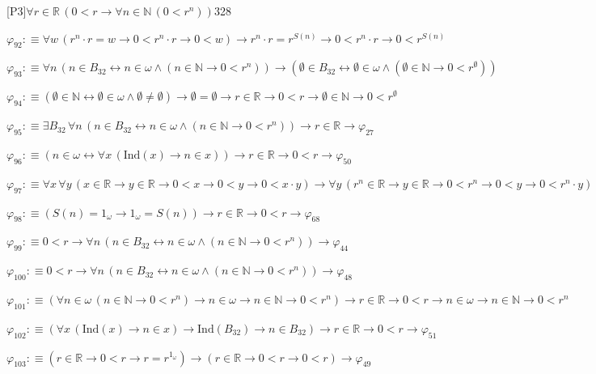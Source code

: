 \begin{fullproof}{[P3]}{$\forall r \in \mathbb{R}\,(0 < r \to \forall n \in \mathbb{N}\,(0 < {{r}^{n}}))$}{328}
\begin{abbrevlist}
\item $\varphi_{92} :\equiv \forall w\,({{r}^{n}} \cdot r = w \to 0 < {{r}^{n}} \cdot r \to 0 < w) \to {{r}^{n}} \cdot r = {{r}^{S(n)}} \to 0 < {{r}^{n}} \cdot r \to 0 < {{r}^{S(n)}}$
\item $\varphi_{93} :\equiv \forall n\,(n \in B_{32} \leftrightarrow n \in \omega \land (n \in \mathbb{N} \to 0 < {{r}^{n}})) \to (\emptyset \in B_{32} \leftrightarrow \emptyset \in \omega \land (\emptyset \in \mathbb{N} \to 0 < {{r}^{\emptyset}}))$
\item $\varphi_{94} :\equiv (\emptyset \in \mathbb{N} \leftrightarrow \emptyset \in \omega \land \emptyset \neq \emptyset) \to \emptyset = \emptyset \to r \in \mathbb{R} \to 0 < r \to \emptyset \in \mathbb{N} \to 0 < {{r}^{\emptyset}}$
\item $\varphi_{95} :\equiv \exists B_{32}\,\forall n\,(n \in B_{32} \leftrightarrow n \in \omega \land (n \in \mathbb{N} \to 0 < {{r}^{n}})) \to r \in \mathbb{R} \to \varphi_{27}$
\item $\varphi_{96} :\equiv (n \in \omega \leftrightarrow \forall x\,(\mathrm{Ind}(x) \to n \in x)) \to r \in \mathbb{R} \to 0 < r \to \varphi_{50}$
\item $\varphi_{97} :\equiv \forall x\,\forall y\,(x \in \mathbb{R} \to y \in \mathbb{R} \to 0 < x \to 0 < y \to 0 < x \cdot y) \to \forall y\,({{r}^{n}} \in \mathbb{R} \to y \in \mathbb{R} \to 0 < {{r}^{n}} \to 0 < y \to 0 < {{r}^{n}} \cdot y)$
\item $\varphi_{98} :\equiv (S(n) = 1_{\omega} \to 1_{\omega} = S(n)) \to r \in \mathbb{R} \to 0 < r \to \varphi_{68}$
\item $\varphi_{99} :\equiv 0 < r \to \forall n\,(n \in B_{32} \leftrightarrow n \in \omega \land (n \in \mathbb{N} \to 0 < {{r}^{n}})) \to \varphi_{44}$
\item $\varphi_{100} :\equiv 0 < r \to \forall n\,(n \in B_{32} \leftrightarrow n \in \omega \land (n \in \mathbb{N} \to 0 < {{r}^{n}})) \to \varphi_{48}$
\item $\varphi_{101} :\equiv (\forall n \in \omega\,(n \in \mathbb{N} \to 0 < {{r}^{n}}) \to n \in \omega \to n \in \mathbb{N} \to 0 < {{r}^{n}}) \to r \in \mathbb{R} \to 0 < r \to n \in \omega \to n \in \mathbb{N} \to 0 < {{r}^{n}}$
\item $\varphi_{102} :\equiv (\forall x\,(\mathrm{Ind}(x) \to n \in x) \to \mathrm{Ind}(B_{32}) \to n \in B_{32}) \to r \in \mathbb{R} \to 0 < r \to \varphi_{51}$
\item $\varphi_{103} :\equiv (r \in \mathbb{R} \to 0 < r \to r = {{r}^{1_{\omega}}}) \to (r \in \mathbb{R} \to 0 < r \to 0 < r) \to \varphi_{49}$

\end{abbrevlist}
\end{fullproof}
